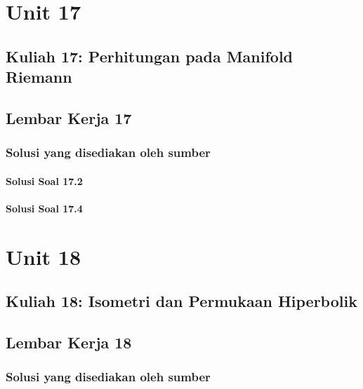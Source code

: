 \documentclass[11pt,a4paper,oneside]{book}
\begin{document}
\part{Unit 17}
\chapter[Kuliah 17]{Kuliah 17: Perhitungan pada Manifold Riemann}


\chapter{Lembar Kerja 17}


\section*{Solusi yang disediakan oleh sumber}
\subsection*{Solusi Soal 17.2}

\subsection*{Solusi Soal 17.4}


\part{Unit 18}
\chapter[Kuliah 18]{Kuliah 18: Isometri dan Permukaan Hiperbolik}


\chapter{Lembar Kerja 18}


\section*{Solusi yang disediakan oleh sumber}
\end{document}

